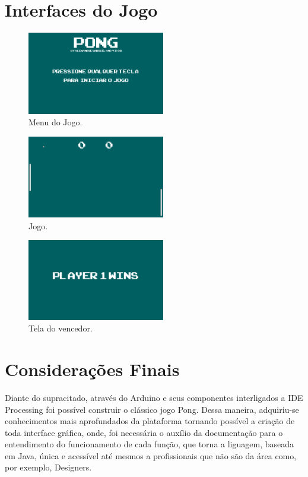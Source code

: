\documentclass[conference]{IEEEtran}
\begin{document}
\section{Interfaces do Jogo}
\begin{figure}[htbp]
\centerline{
    \includegraphics[width= 6cm]{images/Menu.png}
    }
\caption{Menu do Jogo.}
\label{fig:arduino}
\end{figure}
\begin{figure}[htbp]
\centerline{
    \includegraphics[width= 6cm]{images/Jogo.png}
    }
\caption{Jogo.}
\label{fig:arduino}
\end{figure}
\begin{figure}[htbp]
\centerline{
    \includegraphics[width= 6cm]{images/Win.png}
    }
\caption{Tela do vencedor.}
\label{fig:arduino}
\end{figure}

\section*{Considerações Finais}
Diante do supracitado,  através do Arduino e seus componentes interligados a IDE Processing foi possível construir o clássico jogo Pong. Dessa maneira, adquiriu-se conhecimentos mais aprofundados da plataforma tornando possível a criação de toda interface gráfica, onde, foi necessária o auxílio da documentação para o entendimento do funcionamento de cada função, que torna a liguagem, baseada em Java, única e acessível até mesmos a profissionais que não são da área como, por exemplo, Designers.
\end{document}
